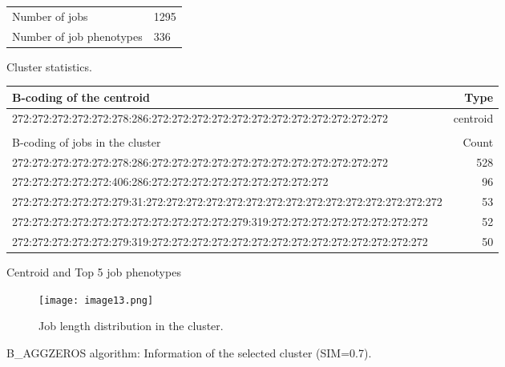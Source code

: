 \documentclass{jhps}
\begin{document}
\begin{figure}
	\begin{subtable}{\textwidth}
		\centering
		\begin{tabular}{ll}
			\centering
			Number of jobs & 1295 \\
			Number of job phenotypes & 336 \\
		\end{tabular}
		\caption{Cluster statistics.}
		\label{cluster:bin_aggzeros:stats}
	\end{subtable}
	\medskip
	\begin{subtable}{\textwidth}
		\centering
		\begin{tiny}
			\begin{tabular}{l|r}
				\rowcolor{tblhead}
				B-coding of the centroid                                                                         &  Type     \\
				\hline
				272:272:272:272:272:278:286:272:272:272:272:272:272:272:272:272:272:272:272            &  centroid \\
				\multicolumn{2}{l}{}                                                                   \\
				\hline
				\rowcolor{tblhead}
				B-coding of jobs in the cluster                                                                          &  Count    \\
				272:272:272:272:272:278:286:272:272:272:272:272:272:272:272:272:272:272:272            &  528      \\
				272:272:272:272:272:406:286:272:272:272:272:272:272:272:272:272                        &  96       \\
				272:272:272:272:272:279:31:272:272:272:272:272:272:272:272:272:272:272:272:272:272:272 &  53       \\
				272:272:272:272:272:272:272:272:272:272:272:279:319:272:272:272:272:272:272:272:272    &  52       \\
				272:272:272:272:272:279:319:272:272:272:272:272:272:272:272:272:272:272:272:272:272    &  50       \\
			\end{tabular}
		\end{tiny}
		\caption{Centroid and Top 5 job phenotypes}
		\label{cluster:bin_aggzeros:top_jobs}
	\end{subtable}
	\medskip
	\begin{subfigure}{\textwidth}
		\centering
		\texttt{[image: image13.png]}
		\caption{Job length distribution in the cluster.}
		\label{cluster:bin_aggzeros:length}
	\end{subfigure}
	\caption{B\_AGGZEROS algorithm: Information of the selected cluster (SIM=0.7).}
	\label{cluster:bin_aggzeros}
\end{figure}
\end{document}
